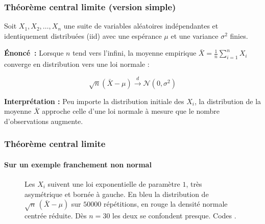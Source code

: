 \documentclass[10pt]{beamer}
\begin{document}
\begin{frame}
  \frametitle{Théorème central limite (version simple)}

  Soit $X_1, X_2, \ldots, X_n$ une suite de variables aléatoires indépendantes et identiquement distribuées (iid) avec une espérance $\mu$ et une variance $\sigma^2$ finies.

  \medskip

  \textbf{Énoncé~:} Lorsque $n$ tend vers l'infini, la moyenne empirique $\bar{X} = \frac{1}{n} \sum_{i=1}^n X_i$ converge en distribution vers une loi normale :

  \[
  \sqrt{n}\left(\bar{X} - \mu\right) \xrightarrow{d} \mathcal{N}\left(0, \sigma^2\right)
  \]

  \medskip

  \textbf{Interprétation :} Peu importe la distribution initiale des $X_i$, la distribution de la moyenne $\bar{X}$ approche celle d'une loi normale à mesure que le nombre d'observations augmente.

\end{frame}


\begin{frame}[c]
  \frametitle{Théorème central limite}
  \framesubtitle{Sur un exemple franchement non normal}

  \begin{figure}
    \centering
    \scalebox{.34}{}
    \caption{Les $X_i$ suivent une loi exponentielle de paramètre $1$, très
      asymétrique et bornée à gauche. En bleu la distribution de
      $\sqrt n\,(\bar X - \mu)$ sur $50000$ répétitions, en rouge la densité normale
      centrée réduite. Dès $n=30$ les deux se confondent presque. Codes
      .}
  \end{figure}

\end{frame}
\end{document}
